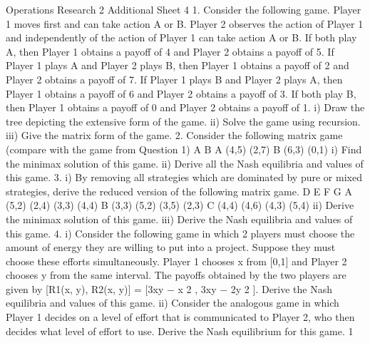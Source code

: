 Operations Research 2
Additional Sheet 4
1. Consider the following game. Player 1 moves first and can take action A or B.
Player 2 observes the action of Player 1 and independently of the action of Player 1 can
take action A or B. If both play A, then Player 1 obtains a payoff of 4 and Player 2
obtains a payoff of 5. If Player 1 plays A and Player 2 plays B, then Player 1 obtains a
payoff of 2 and Player 2 obtains a payoff of 7. If Player 1 plays B and Player 2 plays A,
then Player 1 obtains a payoff of 6 and Player 2 obtains a payoff of 3. If both play B,
then Player 1 obtains a payoff of 0 and Player 2 obtains a payoff of 1.
i) Draw the tree depicting the extensive form of the game.
ii) Solve the game using recursion.
iii) Give the matrix form of the game.
2. Consider the following matrix game (compare with the game from Question 1)
A B
A (4,5) (2,7)
B (6,3) (0,1)
i) Find the minimax solution of this game.
ii) Derive all the Nash equilibria and values of this game.
3. i) By removing all strategies which are dominated by pure or mixed strategies,
derive the reduced version of the following matrix game.
D E F G
A (5,2) (2,4) (3,3) (4,4)
B (3,3) (5,2) (3,5) (2,3)
C (4,4) (4,6) (4,3) (5,4)
ii) Derive the minimax solution of this game.
iii) Derive the Nash equilibria and values of this game.
4. i) Consider the following game in which 2 players must choose the amount of
energy they are willing to put into a project. Suppose they must choose these efforts
simultaneously. Player 1 chooses x from [0,1] and Player 2 chooses y from the same
interval. The payoffs obtained by the two players are given by
[R1(x, y), R2(x, y)] = [3xy − x
2
, 3xy − 2y
2
].
Derive the Nash equilibria and values of this game.
ii) Consider the analogous game in which Player 1 decides on a level of effort that is
communicated to Player 2, who then decides what level of effort to use. Derive the Nash
equilibrium for this game.
1

